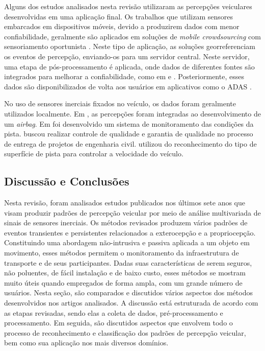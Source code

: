 Alguns dos estudos analisados nesta revisão utilizaram as percepções veiculares desenvolvidas em uma aplicação final. Os trabalhos que utilizam sensores embarcados em dispositivos móveis, devido a produzirem dados com menor confiabilidade, geralmente são aplicados em soluções de \textit{mobile crowdsourcing} com sensoriamento oportunista \cite{Afrin2015,Ghadge2015,Kaur2017,Kumar2017,Li2018,Lima2016,Pooja2017,Rishiwal2016,Savera2016,Singh2017, Strutu2013,Vittorio2014}. Neste tipo de aplicação, as soluções georreferenciam os eventos de percepção, enviando-os para um servidor central. Neste servidor, uma etapa de pós-processamento é aplicada, onde dados de diferentes fontes são integrados para melhorar a confiabilidade, como em \cite{Gawad2016} e \cite{Pooja2017}. Posteriormente, esses dados são disponibilizados de volta aos usuários em aplicativos como o ADAS \cite{Afrin2015,Akhtar2014,Nalavde2015}.

No uso de sensores inerciais fixados no veículo, os dados foram geralmente utilizados localmente. Em \cite{Selmanaj2014}, as percepções foram integradas ao desenvolvimento de um \textit{airbag}. Em \cite{Tomiyama2016} foi desenvolvido um sistema de monitoramento das condições da pista. \cite{Pitonak2016} buscou realizar controle de qualidade e garantia de qualidade no processo de entrega de projetos de engenharia civil. \cite{Khaleghian2017} utilizou do reconhecimento do tipo de superfície de pista para controlar a velocidade do veículo.

\subsection{Discussão e Conclusões}

Nesta revisão, foram analisados estudos publicados nos últimos sete anos que visam produzir padrões de percepção veicular por meio de análise multivariada de sinais de sensores inerciais. Os métodos revisados produzem vários padrões de eventos transientes e persistentes relacionados a exterocepção e a propriocepção. Constituindo uma abordagem não-intrusiva e passiva aplicada a um objeto em movimento, esses métodos permitem o monitoramento da infraestrutura de transporte e de seus participantes. Dadas suas características de serem seguros, não poluentes, de fácil instalação e de baixo custo, esses métodos se mostram muito úteis quando empregados de forma ampla, com um grande número de usuários. Nesta seção, são comparados e discutidos vários aspectos dos métodos desenvolvidos nos artigos analisados. A discussão está estruturada de acordo com as etapas revisadas, sendo elas a coleta de dados, pré-processamento e processamento. Em seguida, são discutidos aspectos que envolvem todo o processo de reconhecimento e classificação dos padrões de percepção veicular, bem como sua aplicação nos mais diversos domínios.


